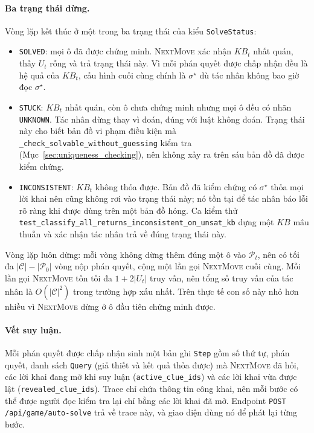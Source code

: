 \begin{sloppypar}
\paragraph{Ba trạng thái dừng.}
Vòng lặp kết thúc ở một trong ba trạng thái của kiểu \texttt{SolveStatus}:
\begin{itemize}
  \item \texttt{SOLVED}: mọi ô đã được chứng minh. \textsc{NextMove} xác nhận
    $\mathit{KB}_t$ nhất quán, thấy $U_t$ rỗng và trả trạng thái này. Vì mỗi
    phán quyết được chấp nhận đều là hệ quả của $\mathit{KB}_t$, cấu hình cuối
    cùng chính là $\sigma^\star$ dù tác nhân không bao giờ đọc $\sigma^\star$.
  \item \texttt{STUCK}: $\mathit{KB}_t$ nhất quán, còn ô chưa chứng minh nhưng
    mọi ô đều có nhãn \texttt{UNKNOWN}. Tác nhân dừng thay vì đoán, đúng với
    luật không đoán. Trạng thái này cho biết bản đồ vi phạm điều kiện mà
    \texttt{\_check\_solvable\_without\_guessing} kiểm tra
    (Mục~\ref{sec:uniqueness_checking}), nên không xảy ra trên sáu bản đồ đã
    được kiểm chứng.
  \item \texttt{INCONSISTENT}: $\mathit{KB}_t$ không thỏa được. Bản đồ đã kiểm
    chứng có $\sigma^\star$ thỏa mọi lời khai nên cũng không rơi vào trạng thái
    này; nó tồn tại để tác nhân báo lỗi rõ ràng khi được dùng trên một bản đồ
    hỏng. Ca kiểm thử
    \texttt{test\_classify\_all\_\allowbreak returns\_\allowbreak inconsistent\_\allowbreak on\_unsat\_kb} dựng
    một $\mathit{KB}$ mâu thuẫn và xác nhận tác nhân trả về đúng trạng thái
    này.
\end{itemize}
Vòng lặp luôn dừng: mỗi vòng không dừng thêm đúng một ô vào $\mathcal{P}_t$,
nên có tối đa $|\mathcal{C}| - |\mathcal{P}_0|$ vòng nộp phán quyết, cộng một
lần gọi \textsc{NextMove} cuối cùng. Mỗi lần gọi \textsc{NextMove} tốn tối đa
$1 + 2|U_t|$ truy vấn, nên tổng số truy vấn của tác nhân là $O(|\mathcal{C}|^2)$
trong trường hợp xấu nhất. Trên thực tế con số này nhỏ hơn nhiều vì
\textsc{NextMove} dừng ở ô đầu tiên chứng minh được.

\paragraph{Vết suy luận.}
Mỗi phán quyết được chấp nhận sinh một bản ghi \texttt{Step} gồm số thứ tự,
phán quyết, danh sách \texttt{Query} (giả thiết và kết quả thỏa được) mà
\textsc{NextMove} đã hỏi, các lời khai đang mở khi suy luận
(\texttt{active\_clue\_ids}) và các lời khai vừa được lật
(\texttt{revealed\_clue\_ids}). Trace chỉ chứa thông tin công khai, nên mỗi
bước có thể được người đọc kiểm tra lại chỉ bằng các lời khai đã mở. Endpoint
\texttt{POST /api/game/auto-solve} trả về trace này, và giao diện dùng nó để
phát lại từng bước.


\end{sloppypar}
